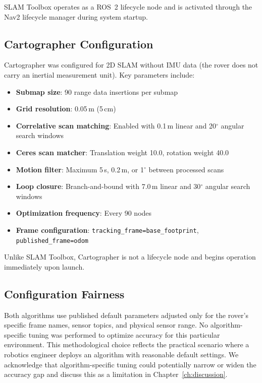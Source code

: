 SLAM Toolbox operates as a ROS~2 lifecycle node and is activated through the Nav2 lifecycle manager during system startup.

\subsection{Cartographer Configuration}

Cartographer was configured for 2D SLAM without IMU data (the rover does not carry an inertial measurement unit). Key parameters include:

\begin{itemize}
\item \textbf{Submap size}: 90 range data insertions per submap
\item \textbf{Grid resolution}: 0.05\,m (5\,cm)
\item \textbf{Correlative scan matching}: Enabled with 0.1\,m linear and 20$^\circ$ angular search windows
\item \textbf{Ceres scan matcher}: Translation weight 10.0, rotation weight 40.0
\item \textbf{Motion filter}: Maximum 5\,s, 0.2\,m, or 1$^\circ$ between processed scans
\item \textbf{Loop closure}: Branch-and-bound with 7.0\,m linear and 30$^\circ$ angular search windows
\item \textbf{Optimization frequency}: Every 90 nodes
\item \textbf{Frame configuration}: \texttt{tracking\_frame=base\_footprint}, \texttt{published\_frame=odom}
\end{itemize}

Unlike SLAM Toolbox, Cartographer is not a lifecycle node and begins operation immediately upon launch.

\subsection{Configuration Fairness}

Both algorithms use published default parameters adjusted only for the rover's specific frame names, sensor topics, and physical sensor range. No algorithm-specific tuning was performed to optimize accuracy for this particular environment. This methodological choice reflects the practical scenario where a robotics engineer deploys an algorithm with reasonable default settings. We acknowledge that algorithm-specific tuning could potentially narrow or widen the accuracy gap and discuss this as a limitation in Chapter~\ref{ch:discussion}.

